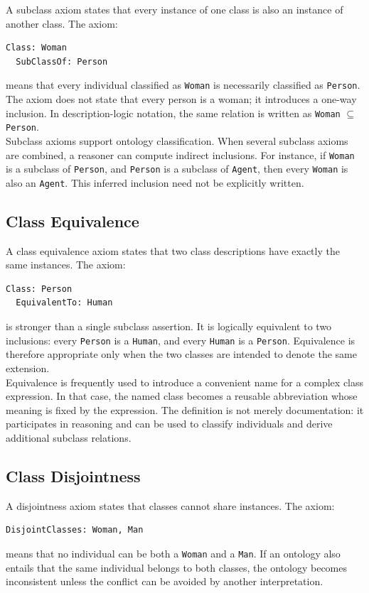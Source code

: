 \documentclass{scrbook}
\begin{document}
	A subclass axiom states that every instance of one class is also an instance of another class. The axiom:
	\begin{lstlisting}
Class: Woman
  SubClassOf: Person
	\end{lstlisting}
	means that every individual classified as \texttt{Woman} is necessarily classified as \texttt{Person}. The axiom does not state that every person is a woman; it introduces a one-way inclusion. In description-logic notation, the same relation is written as \texttt{Woman} $\subseteq$ \texttt{Person}.\\
	
	Subclass axioms support ontology classification. When several subclass axioms are combined, a reasoner can compute indirect inclusions. For instance, if \texttt{Woman} is a subclass of \texttt{Person}, and \texttt{Person} is a subclass of \texttt{Agent}, then every \texttt{Woman} is also an \texttt{Agent}. This inferred inclusion need not be explicitly written.
	
	\subsection{Class Equivalence}
	
	A class equivalence axiom states that two class descriptions have exactly the same instances. The axiom:
	\begin{lstlisting}
Class: Person
  EquivalentTo: Human
	\end{lstlisting}
	is stronger than a single subclass assertion. It is logically equivalent to two inclusions: every \texttt{Person} is a \texttt{Human}, and every \texttt{Human} is a \texttt{Person}. Equivalence is therefore appropriate only when the two classes are intended to denote the same extension.\\
	
	Equivalence is frequently used to introduce a convenient name for a complex class expression. In that case, the named class becomes a reusable abbreviation whose meaning is fixed by the expression. The definition is not merely documentation: it participates in reasoning and can be used to classify individuals and derive additional subclass relations.
	
	\subsection{Class Disjointness}
	
	A disjointness axiom states that classes cannot share instances. The axiom:
	\begin{lstlisting}
DisjointClasses: Woman, Man
	\end{lstlisting}
	means that no individual can be both a \texttt{Woman} and a \texttt{Man}. If an ontology also entails that the same individual belongs to both classes, the ontology becomes inconsistent unless the conflict can be avoided by another interpretation.\\
	
\end{document}
